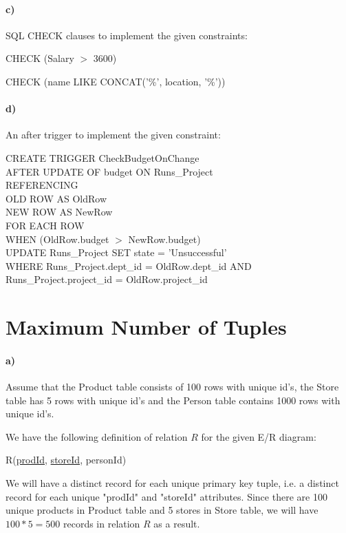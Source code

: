 \documentclass[a4paper,12pt]{article}
\begin{document}
\paragraph{c)} SQL CHECK clauses to implement the given constraints: \\

\begin{tcolorbox}
CHECK (Salary $>$ 3600)
\end{tcolorbox}

\begin{tcolorbox}
CHECK (name LIKE CONCAT('\%', location, '\%'))
\end{tcolorbox}

\paragraph{d)} An after trigger to implement the given constraint: \\

\begin{tcolorbox}
CREATE TRIGGER CheckBudgetOnChange \\
AFTER UPDATE OF budget ON Runs\_Project \\
REFERENCING \\
OLD ROW AS OldRow \\
NEW ROW AS NewRow \\
FOR EACH ROW \\
WHEN (OldRow.budget $>$ NewRow.budget) \\
UPDATE Runs\_Project
SET state = 'Unsuccessful' \\
WHERE Runs\_Project.dept\_id = OldRow.dept\_id AND \\
Runs\_Project.project\_id = OldRow.project\_id 
\end{tcolorbox}

\newpage
\section{Maximum Number of Tuples}

\paragraph{a)}Assume that the Product table consists of 100 rows with unique id’s, the Store table has 5 rows with unique id’s and the Person table contains 1000 rows with unique id’s. \\

\begin{tcolorbox}
We have the following definition of relation $R$ for the given E/R diagram:
\begin{center}
    R(\underline{prodId}, \underline{storeId}, personId)
\end{center}
We will have a distinct record for each unique primary key tuple, i.e. a distinct record for each unique "prodId" and "storeId" attributes. Since there are 100 unique products in Product table and 5 stores in Store table, we will have $100 * 5 = 500$ records in relation $R$ as a result.
\end{tcolorbox}
\end{document}
